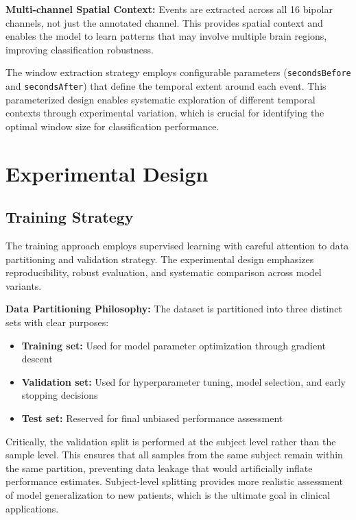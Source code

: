 \textbf{Multi-channel Spatial Context:} Events are extracted across all 16 bipolar channels, not just the annotated channel. This provides spatial context and enables the model to learn patterns that may involve multiple brain regions, improving classification robustness.

The window extraction strategy employs configurable parameters (\texttt{secondsBefore} and \texttt{secondsAfter}) that define the temporal extent around each event. This parameterized design enables systematic exploration of different temporal contexts through experimental variation, which is crucial for identifying the optimal window size for classification performance.


\section{Experimental Design}
\label{sec:experimental_design}

\subsection{Training Strategy}
\label{sec:training_strategy}

The training approach employs supervised learning with careful attention to data partitioning and validation strategy. The experimental design emphasizes reproducibility, robust evaluation, and systematic comparison across model variants.

\textbf{Data Partitioning Philosophy:} The dataset is partitioned into three distinct sets with clear purposes:
\begin{itemize}
    \item \textbf{Training set:} Used for model parameter optimization through gradient descent
    \item \textbf{Validation set:} Used for hyperparameter tuning, model selection, and early stopping decisions
    \item \textbf{Test set:} Reserved for final unbiased performance assessment
\end{itemize}

Critically, the validation split is performed at the subject level rather than the sample level. This ensures that all samples from the same subject remain within the same partition, preventing data leakage that would artificially inflate performance estimates. Subject-level splitting provides more realistic assessment of model generalization to new patients, which is the ultimate goal in clinical applications.

